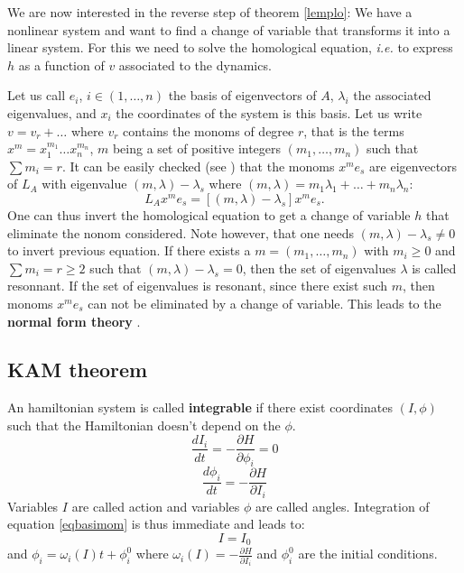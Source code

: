 \documentclass[12pt]{book}
\begin{document}
We are now interested in the reverse step of theorem \ref{lemplo}: We
have a nonlinear system and want to find a change of variable that
transforms it into a linear system.
For this we need to solve the homological equation, {\it i.e.} to
express $h$ as a function of $v$ associated to the dynamics.

Let us call
$e_i$, $i\in (1,\dots,n)$ the basis of eigenvectors of $A$,
$\lambda_i$ the associated 
eigenvalues, and $x_i$ the coordinates of the system is this basis.
Let us write $v=v_r+\dots$ where $v_r$ contains the monoms of degree
$r$, that is the terms $x^{m}=x_1^{m_1}\dots x_n^{m_n}$, $m$ being
a set of positive integers $(m_1,\dots,m_n)$ such that $\sum m_i=r$. 
It can be easily checked (see \cite{ma:equad:Arnold83}) that the monoms
$x^me_s$ are eigenvectors of $L_A$ with eigenvalue 
$(m,\lambda)-\lambda_s$ where
$(m,\lambda)=m_1\lambda_1+\dots+m_n\lambda_n$:
\begin{equation}
L_Ax^me_s=[(m,\lambda)-\lambda_s]x^me_s.
\end{equation}
One can thus invert the homological equation to get a change of
variable $h$ that eliminate the nonom considered. 
Note however, that one needs $(m,\lambda)-\lambda_s\neq 0$ to invert
previous equation.
If there exists a $m=(m_1,\dots,m_n)$ with $m_i\geq 0$ and $\sum
m_i=r\geq 2$ such that 
$(m,\lambda)-\lambda_s=0$, then the set of eigenvalues $\lambda$ is
called resonnant.
If the set of eigenvalues is resonant, since there exist such $m$,
then monoms $x^me_s$ can not be eliminated by a change of variable.
This leads to the {\bf normal form theory} \cite{ma:equad:Arnold83}.

\subsection{KAM theorem}

An hamiltonian system is called {\bf integrable} if there exist
coordinates $(I,\phi)$ such that the Hamiltonian
doesn't depend on the $\phi$.
\begin{equation}\label{eqbasimom}
\frac{dI_i}{dt}=-\frac{\partial H}{\partial \phi_i}=0
\end{equation}
\begin{equation}
\frac{d\phi_i}{dt}=-\frac{\partial H}{\partial I_i}
\end{equation}
Variables $I$ are called action and variables $\phi$ are called
angles.
Integration of equation \ref{eqbasimom} is thus immediate and leads to:
\begin{equation}
I=I_0
\end{equation}
and $\phi_i=\omega_i(I)t+\phi_i^0$ where $\omega_i(I)=-\frac{\partial
H}{\partial I_i}$ and $\phi_i^0$ are the initial conditions.
\end{document}
